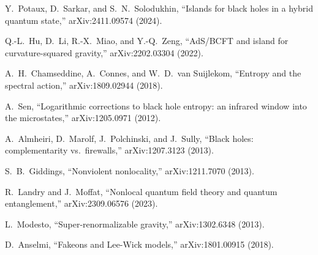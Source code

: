 \documentclass[11pt,a4paper]{article}
\theoremstyle{plain}
\theoremstyle{definition}
\begin{document}
\begin{enumerate}[label={[\arabic*]}]
\item\label{ref:Solodukhin2024} Y.~Potaux, D.~Sarkar, and
  S.~N.~Solodukhin, ``Islands for black holes in a hybrid quantum state,''
  arXiv:2411.09574 (2024).

\item\label{ref:HuMiao} Q.-L.~Hu, D.~Li, R.-X.~Miao, and Y.-Q.~Zeng,
  ``AdS/BCFT and island for curvature-squared gravity,''
  arXiv:2202.03304 (2022).

\item\label{ref:CCS2018} A.~H.~Chamseddine, A.~Connes, and
  W.~D.~van Suijlekom, ``Entropy and the spectral action,''
  arXiv:1809.02944 (2018).

\item\label{ref:Sen2012} A.~Sen, ``Logarithmic corrections to black
  hole entropy: an infrared window into the microstates,''
  arXiv:1205.0971 (2012).

\item\label{ref:AMPS} A.~Almheiri, D.~Marolf, J.~Polchinski, and
  J.~Sully, ``Black holes: complementarity vs.\ firewalls,''
  arXiv:1207.3123 (2013).

\item\label{ref:Giddings} S.~B.~Giddings, ``Nonviolent nonlocality,''
  arXiv:1211.7070 (2013).

\item\label{ref:Landry} R.~Landry and J.~Moffat, ``Nonlocal quantum
  field theory and quantum entanglement,'' arXiv:2309.06576 (2023).

\item\label{ref:Modesto} L.~Modesto, ``Super-renormalizable gravity,''
  arXiv:1302.6348 (2013).

\item\label{ref:AnselmiFakeon} D.~Anselmi, ``Fakeons and Lee-Wick
  models,'' arXiv:1801.00915 (2018).
\end{enumerate}
\end{document}
